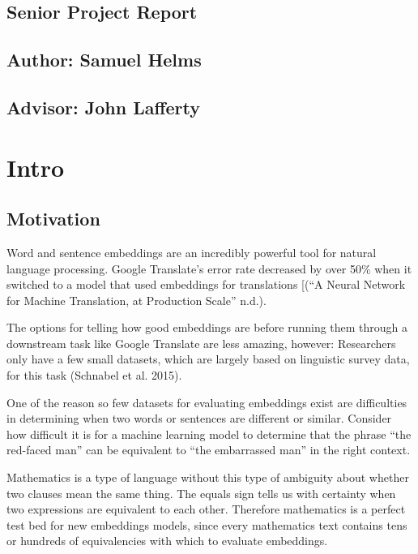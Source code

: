 \documentclass[]{article}
\date{}
\begin{document}
{
\setcounter{tocdepth}{3}
\tableofcontents
}
\hypertarget{senior-project-report}{%
\subsection{Senior Project Report}\label{senior-project-report}}

\hypertarget{author-samuel-helms}{%
\subsection{Author: Samuel Helms}\label{author-samuel-helms}}

\hypertarget{advisor-john-lafferty}{%
\subsection{Advisor: John Lafferty}\label{advisor-john-lafferty}}

\hypertarget{intro}{%
\section{Intro}\label{intro}}

\hypertarget{motivation}{%
\subsection{Motivation}\label{motivation}}

Word and sentence embeddings are an incredibly powerful tool for natural
language processing. Google Translate's error rate decreased by over
50\% when it switched to a model that used embeddings for translations
{[}(``A Neural Network for Machine Translation, at Production Scale''
n.d.).

The options for telling how good embeddings are before running them
through a downstream task like Google Translate are less amazing,
however: Researchers only have a few small datasets, which are largely
based on linguistic survey data, for this task (Schnabel et al. 2015).

One of the reason so few datasets for evaluating embeddings exist are
difficulties in determining when two words or sentences are different or
similar. Consider how difficult it is for a machine learning model to
determine that the phrase ``the red-faced man'' can be equivalent to
``the embarrassed man'' in the right context.

Mathematics is a type of language without this type of ambiguity about
whether two clauses mean the same thing. The equals sign tells us with
certainty when two expressions are equivalent to each other. Therefore
mathematics is a perfect test bed for new embeddings models, since every
mathematics text contains tens or hundreds of equivalencies with which
to evaluate embeddings.
\end{document}
